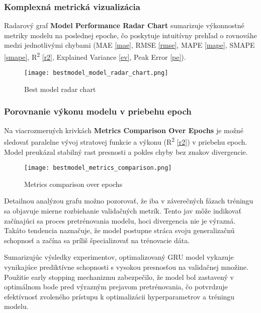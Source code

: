 \newpage

\subsubsection{Komplexná metrická vizualizácia}

Radarový graf \textbf{Model Performance Radar Chart} sumarizuje výkonnostné metriky modelu na poslednej epoche, čo poskytuje intuitívny prehľad o rovnováhe medzi jednotlivými chybami (MAE \ref{mae}, RMSE \ref{rmse}, MAPE \ref{mape}, SMAPE \ref{smape}, R\textsuperscript{2} \ref{r2}, Explained Variance \ref{ev}, Peak Error \ref{pe}).

\begin{figure}[ht!]
\centering
\texttt{[image: bestmodel\_model\_radar\_chart.png]}
\caption{Best model radar chart}
\label{fig:bestmodel_radar_chart}
\end{figure}

\newpage

\subsubsection{Porovnanie výkonu modelu v priebehu epoch}

Na viacrozmerných krivkách \textbf{Metrics Comparison Over Epochs} je možné sledovať paralelne vývoj stratovej funkcie a výkonu (R\textsuperscript{2} \ref{r2}) v priebehu epoch. Model preukázal stabilný rast presnosti a pokles chyby bez znakov divergencie.

\begin{figure}[ht!]
\centering
\texttt{[image: bestmodel\_metrics\_comparison.png]}
\caption{Metrics comparison over epochs}
\label{fig:bestmodel_metrics_comparison}
\end{figure}

Detailnou analýzou grafu možno pozorovať, že iba v záverečných fázach tréningu sa objavuje mierne rozbiehanie validačných metrík. Tento jav môže indikovať začínajúci sa proces pretrénovania modelu, hoci divergencia nie je výrazná. Takáto tendencia naznačuje, že model postupne stráca svoju generalizačnú schopnosť a začína sa príliš špecializovať na trénovacie dáta.

Sumarizujúc výsledky experimentov, optimalizovaný GRU model vykazuje vynikajúce prediktívne schopnosti s vysokou presnosťou na validačnej množine. Použitie early stopping mechanizmu zabezpečilo, že model bol zastavený v optimálnom bode pred výrazným prejavom pretrénovania, čo potvrdzuje efektívnosť zvoleného prístupu k optimalizácii hyperparametrov a tréningu modelu.